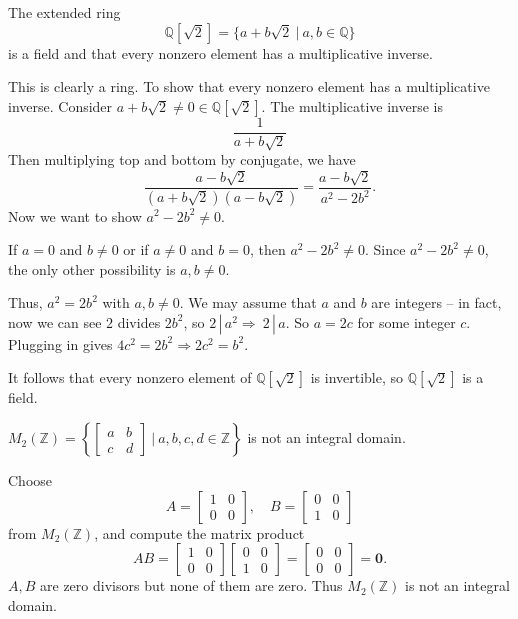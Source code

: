 \begin{example}
    The extended ring
    \[
        \mathbb{Q}[\sqrt{2}] = \{ a+b\sqrt{2} \> | \> a,b \in \mathbb{Q} \}
    \]
    is a field and that every nonzero element has a multiplicative inverse.
\end{example}
\begin{solution}
    This is clearly a ring. To show that every nonzero element has a multiplicative inverse. 
    Consider $a + b\sqrt{2} \neq 0 \in \mathbb{Q}[\sqrt{2}]$. The multiplicative inverse is 
    \[
        \frac{1}{a + b\sqrt{2}}
    \]
    Then multiplying top and bottom by conjugate, we have 
    \[
        \frac{a - b\sqrt{2}}{(a + b\sqrt{2})(a - b\sqrt{2})} = \frac{a - b\sqrt{2}}{a^2 - 2b^2}.
    \]
    Now we want to show $a^2 - 2b^2 \neq 0$.

    If $a = 0$ and $b \neq 0$ or if $a \neq 0$ and $b=0$, then $a^2 - 2b^2 \neq 0$. Since 
    $a^2 - 2b^2 \neq 0$, the only other possibility is $a, b \neq 0$.

    Thus, $a^2 = 2b^2$ with $a,b \neq 0$. We may assume that $a$ and $b$ are integers -- 
    in fact, now we can see $2$ divides $2b^2$, so $2 \,| \, a^2 \Longrightarrow \> 2 \, | \, a$. So 
    $a = 2c$ for some integer $c$. Plugging in gives $4c^2 = 2b^2 \Longrightarrow 2c^2 = b^2$.

    It follows that every nonzero element of $\mathbb{Q}[\sqrt{2}]$ is invertible, so 
    $\mathbb{Q}[\sqrt{2}]$ is a field.
\end{solution}

\begin{example}
    $\displaystyle M_2(\mathbb{Z}) = \left\{ \begin{bmatrix}
    a & b\\ c & d
    \end{bmatrix} \> \bigg \vert \> a,b,c,d \in \mathbb{Z} \right\}$ is not an integral domain.
\end{example}
\begin{solution}
    Choose
    \[
        A = \begin{bmatrix}
            1 & 0\\ 0 & 0
        \end{bmatrix}, \quad 
        B = \begin{bmatrix}
            0 & 0\\ 1 & 0
        \end{bmatrix}
    \]
    from $M_2(\mathbb{Z})$, and compute the matrix product
    \[
        AB = \begin{bmatrix}
            1 & 0\\ 0 & 0
        \end{bmatrix}
        \begin{bmatrix}
            0 & 0\\ 1 & 0
        \end{bmatrix} = \begin{bmatrix}
            0 & 0\\ 0 & 0
        \end{bmatrix} = \mathbf{0}.
    \]
    $A, B$ are zero divisors but none of them are zero. Thus $M_2(\mathbb{Z})$ is not an integral domain. 
\end{solution}


